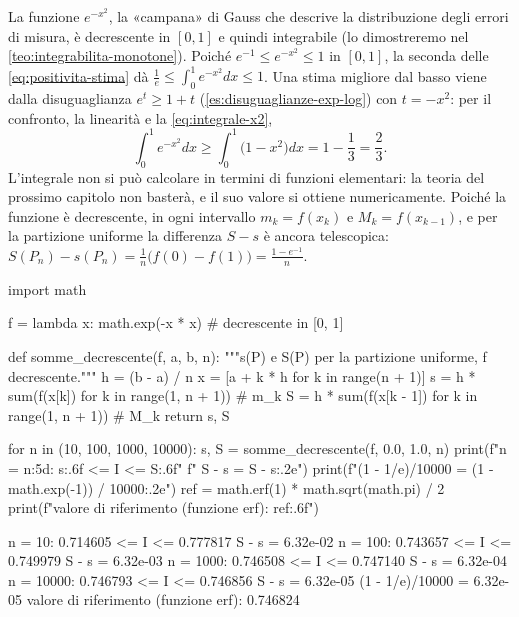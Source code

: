 \begin{esempio}\label{es:stima-gaussiana}
La funzione $e^{-x^{2}}$, la «campana» di Gauss che descrive la distribuzione degli
errori di misura, è decrescente in $[0,1]$ e quindi integrabile (lo dimostreremo nel
\cref{teo:integrabilita-monotone}). Poiché $e^{-1}\le e^{-x^{2}}\le1$ in $[0,1]$, la
seconda delle \eqref{eq:positivita-stima} dà $\frac1e\le\int_{0}^{1}e^{-x^{2}}dx\le1$.
Una stima migliore dal basso viene dalla disuguaglianza $e^{t}\ge1+t$
(\cref{es:disuguaglianze-exp-log}) con $t=-x^{2}$: per il confronto, la linearità e la
\eqref{eq:integrale-x2},
\[
  \int_{0}^{1}e^{-x^{2}}dx\ge\int_{0}^{1}\bigl(1-x^{2}\bigr)dx=1-\frac13=\frac23 .
\]
L'integrale non si può calcolare in termini di funzioni elementari: la teoria del
prossimo capitolo non basterà, e il suo valore si ottiene numericamente. Poiché la
funzione è decrescente, in ogni intervallo $m_{k}=f(x_{k})$ e $M_{k}=f(x_{k-1})$, e per la
partizione uniforme la differenza $S-s$ è ancora telescopica:
$S(P_{n})-s(P_{n})=\frac1n\bigl(f(0)-f(1)\bigr)=\frac{1-e^{-1}}n$.
\end{esempio}

\begin{python}
import math

f = lambda x: math.exp(-x * x)        # decrescente in [0, 1]

def somme_decrescente(f, a, b, n):
    """s(P) e S(P) per la partizione uniforme, f decrescente."""
    h = (b - a) / n
    x = [a + k * h for k in range(n + 1)]
    s = h * sum(f(x[k]) for k in range(1, n + 1))      # m_k
    S = h * sum(f(x[k - 1]) for k in range(1, n + 1))  # M_k
    return s, S

for n in (10, 100, 1000, 10000):
    s, S = somme_decrescente(f, 0.0, 1.0, n)
    print(f"n = {n:5d}:  {s:.6f} <= I <= {S:.6f}"
          f"   S - s = {S - s:.2e}")
print(f"(1 - 1/e)/10000 = {(1 - math.exp(-1)) / 10000:.2e}")
ref = math.erf(1) * math.sqrt(math.pi) / 2
print(f"valore di riferimento (funzione erf): {ref:.6f}")
\end{python}
\begin{risultato}
n =    10:  0.714605 <= I <= 0.777817   S - s = 6.32e-02
n =   100:  0.743657 <= I <= 0.749979   S - s = 6.32e-03
n =  1000:  0.746508 <= I <= 0.747140   S - s = 6.32e-04
n = 10000:  0.746793 <= I <= 0.746856   S - s = 6.32e-05
(1 - 1/e)/10000 = 6.32e-05
valore di riferimento (funzione erf): 0.746824
\end{risultato}

